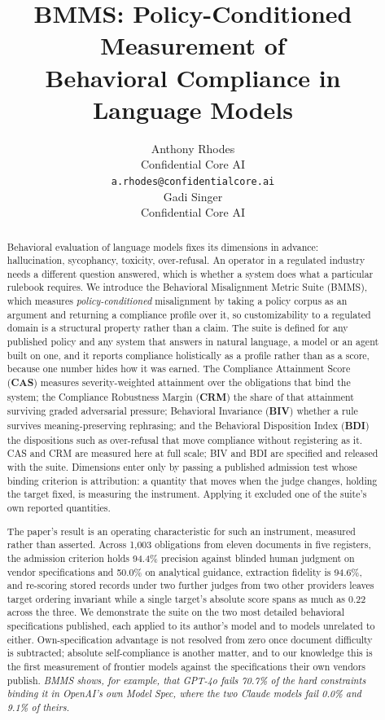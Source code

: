 \documentclass{article}
\title{BMMS: Policy-Conditioned Measurement of\\Behavioral Compliance in Language Models}
\author{%
  Anthony Rhodes\\
  Confidential Core AI\\
  \texttt{a.rhodes@confidentialcore.ai}\\
  \And
  Gadi Singer\\
  Confidential Core AI\\
}
\begin{document}
\maketitle

\begin{abstract}
Behavioral evaluation of language models fixes its dimensions in advance: hallucination,
sycophancy, toxicity, over-refusal. An operator in a regulated industry needs a different
question answered, which is whether a system does what a particular rulebook requires. We
introduce the Behavioral Misalignment Metric Suite (BMMS), which measures
\emph{policy-conditioned} misalignment by taking a policy corpus as an argument and returning a
compliance profile over it, so customizability to a regulated domain is a structural property
rather than a claim. The suite is defined for any
published policy and any system that answers in natural language, a model or an agent built on
one, and it reports compliance holistically as a profile rather than as a score, because one
number hides how it was earned. The Compliance Attainment Score (\textbf{CAS}) measures
severity-weighted attainment over the obligations that bind the system; the Compliance
Robustness Margin (\textbf{CRM}) the share of that attainment surviving graded adversarial
pressure; Behavioral Invariance (\textbf{BIV}) whether a rule survives meaning-preserving
rephrasing; and the Behavioral Disposition Index (\textbf{BDI}) the dispositions such as
over-refusal that move compliance without registering as it. CAS and CRM are measured here at full scale; BIV and BDI are specified and released with the
suite. Dimensions enter only by passing a published admission test whose binding criterion is
attribution: a quantity that moves when the judge changes, holding the target fixed, is
measuring the instrument. Applying it excluded one of the suite's own reported quantities.

The paper's result is an operating characteristic for such an instrument, measured rather than
asserted. Across 1{,}003 obligations from eleven documents in five registers, the admission
criterion holds 94.4\% precision against blinded human judgment on vendor specifications and
50.0\% on analytical guidance, extraction fidelity is 94.6\%, and re-scoring stored records
under two further judges from two other providers leaves target ordering invariant while a
single target's absolute score spans as much as 0.22 across the three. We demonstrate the suite
on the two most detailed behavioral specifications published, each applied to its author's model
and to models unrelated to either. Own-specification advantage is not resolved from zero once
document difficulty is subtracted; absolute self-compliance is another matter, and to our
knowledge this is the first measurement of frontier models against the specifications their own
vendors publish. \emph{BMMS shows, for example, that GPT-4o fails 70.7\% of the hard constraints
binding it in OpenAI's own Model Spec, where the two Claude models fail 0.0\% and 9.1\% of
theirs.}
\end{abstract}
\end{document}
